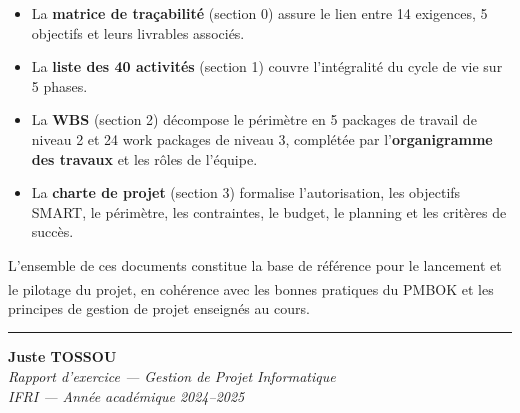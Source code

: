 \documentclass[11pt,a4paper]{article}
\begin{document}
\begin{itemize}
    \item La \textbf{matrice de traçabilité} (section 0) assure le lien entre 14 exigences, 5 objectifs et leurs livrables associés.
    \item La \textbf{liste des 40 activités} (section 1) couvre l'intégralité du cycle de vie sur 5 phases.
    \item La \textbf{WBS} (section 2) décompose le périmètre en 5 packages de travail de niveau 2 et 24 work packages de niveau 3, complétée par l'\textbf{organigramme des travaux} et les rôles de l'équipe.
    \item La \textbf{charte de projet} (section 3) formalise l'autorisation, les objectifs SMART, le périmètre, les contraintes, le budget, le planning et les critères de succès.
\end{itemize}

L'ensemble de ces documents constitue la base de référence pour le lancement et le pilotage du projet, en cohérence avec les bonnes pratiques du PMBOK\textsuperscript{\textregistered} et les principes de gestion de projet enseignés au cours.

\vspace{0.8em}
\hrule
\vspace{0.5em}

\noindent
\begin{flushright}
    \textbf{Juste TOSSOU}\\
    \textit{Rapport d'exercice --- Gestion de Projet Informatique}\\
    \textit{IFRI --- Année académique 2024--2025}
\end{flushright}
\end{document}
